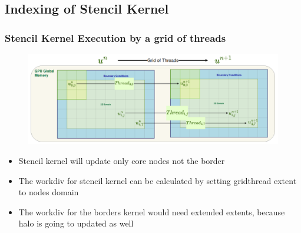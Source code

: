 \documentclass[9pt]{beamer}
\begin{document}
\subsection{Indexing of Stencil Kernel}
\begin{frame}
\frametitle{Stencil Kernel Execution by a grid of threads}
\begin{figure}
    \centering
    \includegraphics[width=0.86\linewidth]{Screenshot from 2024-10-02 16-04-45.png}
\end{figure}

\begin{itemize}
    \item Stencil kernel will update only core nodes not the border
    \item The workdiv for stencil kernel can be calculated by setting gridthread extent to nodes domain
    \item The workdiv for the borders kernel would need extended extents, because halo is going to updated as well
\end{itemize}


\end{frame}
\end{document}
